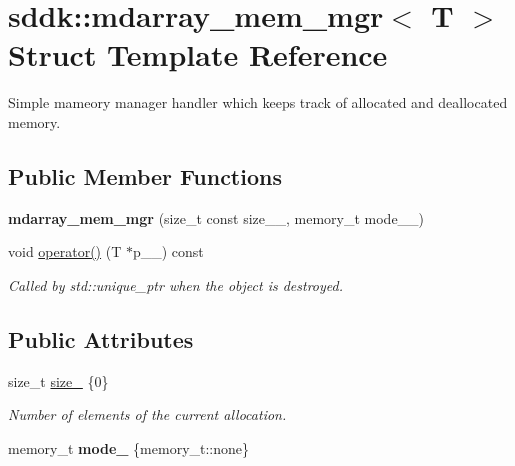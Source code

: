 \hypertarget{structsddk_1_1mdarray__mem__mgr}{}\section{sddk\+:\+:mdarray\+\_\+mem\+\_\+mgr$<$ T $>$ Struct Template Reference}
\label{structsddk_1_1mdarray__mem__mgr}


Simple mameory manager handler which keeps track of allocated and deallocated memory.  


\subsection*{Public Member Functions}
\begin{DoxyCompactItemize}
\item 
\hypertarget{structsddk_1_1mdarray__mem__mgr_a9b20dccea129e71aef384b2eb142a7c4}{}{\bfseries mdarray\+\_\+mem\+\_\+mgr} (size\+\_\+t const size\+\_\+\+\_\+, memory\+\_\+t mode\+\_\+\+\_\+)\label{structsddk_1_1mdarray__mem__mgr_a9b20dccea129e71aef384b2eb142a7c4}

\item 
void \hyperlink{structsddk_1_1mdarray__mem__mgr_a6445b4cdbab711be83f162e7702ddd2f}{operator()} (T $\ast$p\+\_\+\+\_\+) const 
\begin{DoxyCompactList}\small\item\em Called by std\+::unique\+\_\+ptr when the object is destroyed. \end{DoxyCompactList}\end{DoxyCompactItemize}
\subsection*{Public Attributes}
\begin{DoxyCompactItemize}
\item 
size\+\_\+t \hyperlink{structsddk_1_1mdarray__mem__mgr_af4fdc0b787515b21c2aa3460b6512c8e}{size\+\_\+} \{0\}
\begin{DoxyCompactList}\small\item\em Number of elements of the current allocation. \end{DoxyCompactList}\item 
\hypertarget{structsddk_1_1mdarray__mem__mgr_a8d10504b2a8186e577f3614288ebbe30}{}memory\+\_\+t {\bfseries mode\+\_\+} \{memory\+\_\+t\+::none\}\label{structsddk_1_1mdarray__mem__mgr_a8d10504b2a8186e577f3614288ebbe30}

\end{DoxyCompactItemize}


